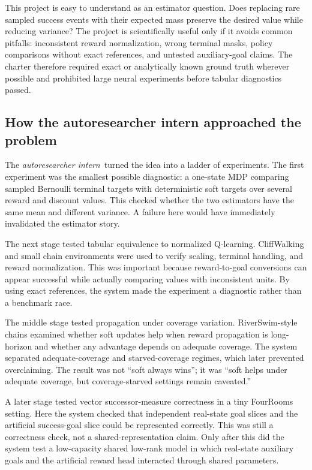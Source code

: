 \documentclass{article}
\newcommand{\intern}{\emph{autoresearcher intern}}
\begin{document}
This project is easy to understand as an estimator question. Does replacing rare sampled success events with their expected mass preserve the desired value while reducing variance? The project is scientifically useful only if it avoids common pitfalls: inconsistent reward normalization, wrong terminal masks, policy comparisons without exact references, and untested auxiliary-goal claims. The charter therefore required exact or analytically known ground truth wherever possible and prohibited large neural experiments before tabular diagnostics passed.

\subsection{How the autoresearcher intern approached the problem}

The \intern\ turned the idea into a ladder of experiments. The first experiment was the smallest possible diagnostic: a one-state MDP comparing sampled Bernoulli terminal targets with deterministic soft targets over several reward and discount values. This checked whether the two estimators have the same mean and different variance. A failure here would have immediately invalidated the estimator story.

The next stage tested tabular equivalence to normalized Q-learning. CliffWalking and small chain environments were used to verify scaling, terminal handling, and reward normalization. This was important because reward-to-goal conversions can appear successful while actually comparing values with inconsistent units. By using exact references, the system made the experiment a diagnostic rather than a benchmark race.

The middle stage tested propagation under coverage variation. RiverSwim-style chains examined whether soft updates help when reward propagation is long-horizon and whether any advantage depends on adequate coverage. The system separated adequate-coverage and starved-coverage regimes, which later prevented overclaiming. The result was not ``soft always wins''; it was ``soft helps under adequate coverage, but coverage-starved settings remain caveated.''

A later stage tested vector successor-measure correctness in a tiny FourRooms setting. Here the system checked that independent real-state goal slices and the artificial success-goal slice could be represented correctly. This was still a correctness check, not a shared-representation claim. Only after this did the system test a low-capacity shared low-rank model in which real-state auxiliary goals and the artificial reward head interacted through shared parameters.
\end{document}
